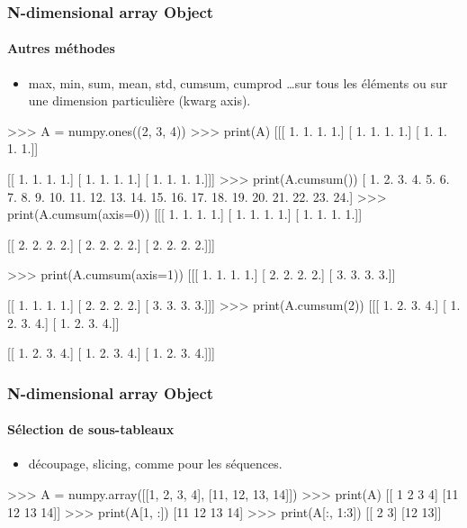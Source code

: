 \begin{frame}[fragile]
\frametitle{N-dimensional array Object}
\framesubtitle{Autres méthodes}
\begin{itemize}
 \item max, min, sum, mean, std, cumsum, cumprod \dots sur tous les éléments ou sur une dimension particulière (kwarg axis). 
\end{itemize}
\begin{minipage}{5cm}
\begin{pythonConsole}
>>> A = numpy.ones((2, 3, 4))
>>> print(A)
[[[ 1.  1.  1.  1.]
  [ 1.  1.  1.  1.]
  [ 1.  1.  1.  1.]]

 [[ 1.  1.  1.  1.]
  [ 1.  1.  1.  1.]
  [ 1.  1.  1.  1.]]]
>>> print(A.cumsum())
[  1.   2.   3.   4.   5.   6.   7.   8.   9.  10.  11.  12.  13.  14.  15. 
  16.  17.  18.  19.  20.  21.  22.  23.  24.]
>>> print(A.cumsum(axis=0))
[[[ 1.  1.  1.  1.]
  [ 1.  1.  1.  1.]
  [ 1.  1.  1.  1.]]

 [[ 2.  2.  2.  2.]
  [ 2.  2.  2.  2.]
  [ 2.  2.  2.  2.]]]
\end{pythonConsole}
\end{minipage}
\begin{minipage}{5cm}
\begin{pythonConsole}
>>> print(A.cumsum(axis=1))
[[[ 1.  1.  1.  1.]
  [ 2.  2.  2.  2.]
  [ 3.  3.  3.  3.]]

 [[ 1.  1.  1.  1.]
  [ 2.  2.  2.  2.]
  [ 3.  3.  3.  3.]]]
>>> print(A.cumsum(2))
[[[ 1.  2.  3.  4.]
  [ 1.  2.  3.  4.]
  [ 1.  2.  3.  4.]]

 [[ 1.  2.  3.  4.]
  [ 1.  2.  3.  4.]
  [ 1.  2.  3.  4.]]]
\end{pythonConsole}
\end{minipage}
\end{frame}
\begin{frame}[fragile]
\frametitle{N-dimensional array Object}
\framesubtitle{Sélection de sous-tableaux}
\begin{itemize}
 \item découpage, slicing, comme pour les séquences.
\end{itemize}
\begin{pythonConsole}
>>> A = numpy.array([[1, 2, 3, 4], [11, 12, 13, 14]])
>>> print(A)
[[ 1  2  3  4]
 [11 12 13 14]]
>>> print(A[1, :])
[11 12 13 14]
>>> print(A[:, 1:3])
[[ 2  3]
 [12 13]]
\end{pythonConsole}
\end{frame}
